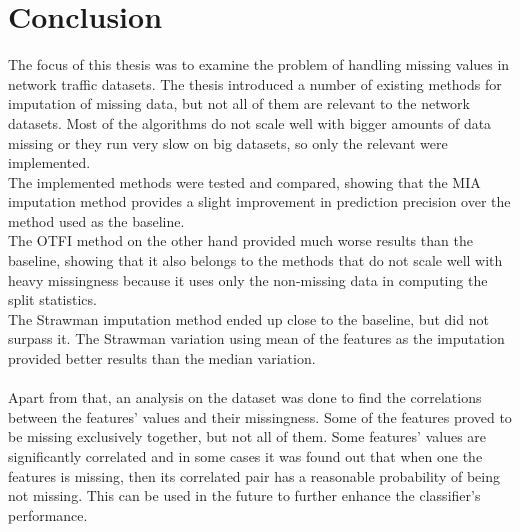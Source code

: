 \documentclass[11pt]{article}
\begin{document}
  \section*{Conclusion}
    The focus of this thesis was to examine the problem of handling missing values in network traffic datasets. The thesis introduced a number of existing methods for imputation of missing data, but not all of them are relevant to the network datasets. Most of the algorithms do not scale well with bigger amounts of data missing or they run very slow on big datasets, so only the relevant were implemented.
    \\
    The implemented methods were tested and compared, showing that the MIA imputation method provides a slight improvement in prediction precision over the method used as the baseline.
    \\
    The OTFI method on the other hand provided much worse results than the baseline, showing that it also belongs to the methods that do not scale well with heavy missingness because it uses only the non-missing data in computing the split statistics.
    \\
    The Strawman imputation method ended up close to the baseline, but did not surpass it. The Strawman variation using mean of the features as the imputation provided better results than the median variation.
    \\~\\
    Apart from that, an analysis on the dataset was done to find the correlations between the features' values and their missingness. Some of the features proved to be missing exclusively together, but not all of them. Some features' values are significantly correlated and in some cases it was found out that when one the features is missing, then its correlated pair has a reasonable probability of being not missing. This can be used in the future to further enhance the classifier's performance.
  \newpage
  
\end{document}
